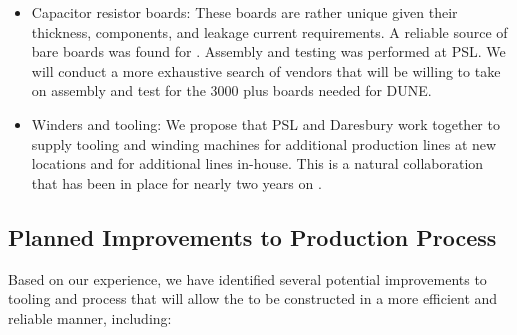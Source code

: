 \begin{itemize}
\item Capacitor resistor boards: These boards are rather unique given their thickness, 
 components, and leakage current requirements. A reliable source of bare boards was found for . Assembly and testing was performed at PSL. We will conduct a more exhaustive search of vendors that will be willing to take on assembly and test for the \num{3000} plus boards needed for DUNE.

\item Winders and tooling: We propose that PSL and Daresbury work together to supply tooling and winding machines for additional production lines at new locations and for additional lines in-house. This is a natural collaboration that has been in place for nearly two years on .

\end{itemize}


\subsection{Planned Improvements to Production Process}

Based on our  experience, we have identified several potential improvements to tooling and process that will allow the  to be constructed in a more efficient and reliable manner, including:

